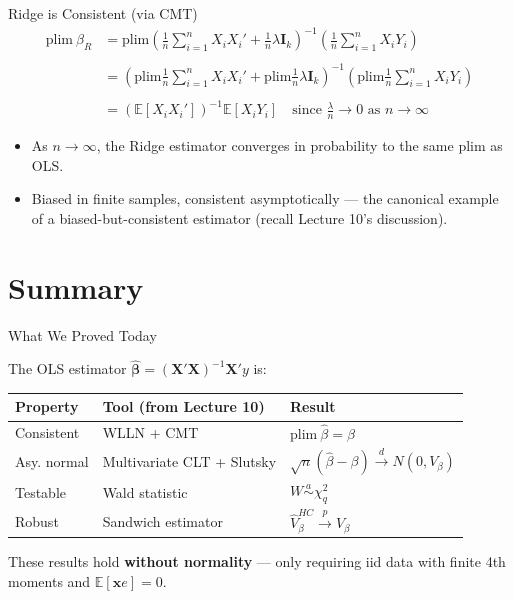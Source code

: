 \documentclass[aspectratio=169, handout, t]{beamer}
\numberwithin{equation}{section}
\begin{document}

\begin{frame}{Ridge is Consistent (via CMT)}
\begin{align*}
\text{plim}\ \hat{\beta}_R
&= \text{plim} \left( \frac{1}{n} \sum_{i=1}^n X_i X_i' + \frac{1}{n} \lambda \bm{I}_k \right)^{-1}
\left( \frac{1}{n} \sum_{i=1}^n X_i Y_i \right) \\
\\
&= \left( \text{plim} \frac{1}{n} \sum_{i=1}^n X_i X_i' + \text{plim} \frac{1}{n} \lambda \bm{I}_k \right)^{-1}
\left( \text{plim} \frac{1}{n} \sum_{i=1}^n X_i Y_i \right) \\
\\
&= \left( \mathbb{E}[X_i X_i'] \right)^{-1} \mathbb{E}[X_i Y_i]
\quad \text{since } \frac{\lambda}{n} \to 0 \text{ as } n \to \infty
\end{align*}

\pause
\begin{itemize}
  \item As \( n \to \infty \), the Ridge estimator converges in probability to the same plim as OLS.
  \item Biased in finite samples, consistent asymptotically --- the canonical example of a biased-but-consistent estimator (recall Lecture 10's discussion).
\end{itemize}
\end{frame}

\section{Summary}

\begin{frame}{What We Proved Today}

The OLS estimator $\bm{\hat{\beta}}=(\bm{X}'\bm{X})^{-1}\bm{X}'y$ is:

\medskip

\renewcommand{\arraystretch}{1.4}
\begin{tabular}{lll}
\toprule
\textbf{Property} & \textbf{Tool (from Lecture 10)} & \textbf{Result} \\
\midrule
Consistent & WLLN + CMT & $\text{plim}\ \hat\beta = \beta$ \\
Asy. normal & Multivariate CLT + Slutsky & $\sqrt{n}(\hat\beta - \beta) \overset{d}{\to} N(0, V_\beta)$ \\
Testable & Wald statistic & $W \overset{a}{\sim} \chi^2_q$ \\
Robust & Sandwich estimator & $\hat{V}_\beta^{HC} \overset{p}{\to} V_\beta$ \\
\bottomrule
\end{tabular}
\renewcommand{\arraystretch}{1.0}

\pause

\bigskip

These results hold \textbf{without normality} --- only requiring iid data with finite 4th moments and $\mathbb{E}[\bm{x}e] = 0$.

\end{frame}
\end{document}
